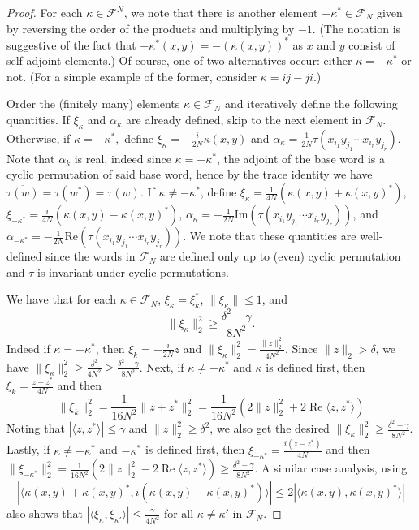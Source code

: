 \documentclass[10pt]{amsart}
\numberwithin{equation}{section}
\theoremstyle{definition}
\newcommand{\cF}{\mathcal{F}}
\begin{document}
\begin{proof}
    For each $\kappa\in \cF^{N}$, we note that there is another element $-\kappa^* \in \cF_N$ given by reversing the order of the products and multiplying by $-1$. (The notation is suggestive of the fact that $-\kappa^*(x,y) = -(\kappa(x,y))^*$ as $x$ and $y$ consist of self-adjoint elements.) Of course, one of two alternatives occur: either $\kappa=-\kappa^*$ or not. (For a simple example of the former, consider $\kappa = ij-ji$.) 

    Order the (finitely many) elements $\kappa \in \cF_N$ and iteratively define the following quantities. 
    If $\xi_\kappa$ and $\alpha_\kappa$ are already defined, skip to the next element in $\cF_N$. 
    Otherwise, if $\kappa=-\kappa^*,$ define $\xi_\kappa = -\frac{i}{2N}\kappa(x,y)$ and $\alpha_\kappa = \frac{1}{2N} \tau(x_{i_1}y_{j_1}\cdots x_{i_r}y_{j_r})$. Note that $\alpha_k$ is real, indeed since $\kappa = -\kappa^\ast$, the adjoint of the base word is a cyclic permutation of said base word, hence by the trace identity we have $\overline{\tau(w)}=\tau(w^\ast) = \tau(w)$.
    If $\kappa\neq -\kappa^*$, define $\xi_\kappa = \frac{1}{4N}(\kappa(x,y)+\kappa(x,y)^*)$,
    $\xi_{-\kappa^*} = \frac{i}{4N}(\kappa(x,y)-\kappa(x,y)^*)$, 
    $\alpha_\kappa = -\frac{1}{2N}\mathrm{Im}(\tau(x_{i_1}y_{j_1}\cdots x_{i_r}y_{j_r}))$,
    and $\alpha_{-\kappa^*} = -\frac{1}{2N}\mathrm{Re}(\tau(x_{i_1}y_{j_1}\cdots x_{i_r}y_{j_r}))$. We note that these quantities are well-defined since the words in $\cF_N$ are defined only up to (even) cyclic permutation and $\tau$ is invariant under cyclic permutations.


    We have that for each $\kappa\in \cF_N$, $\xi_\kappa = \xi_\kappa^*$, $\|\xi_\kappa\| \le 1$, and $$\|\xi_\kappa\|_2^2 \geq \frac{\delta^2-\gamma}{8N^2}.$$ 
    Indeed if $\kappa = - \kappa^\ast$, then $\xi_k = - \frac i {2N}z$ and $\|\xi_\kappa\|_2^2 = \frac{\|z\|_2^2}{4N^2}$. Since $\|z\|_2 > \delta$, we have $\|\xi_\kappa\|_2^2 \ge \frac{\delta^2}{4N^2} \ge \frac{\delta^2 - \gamma}{8N^2}$. Next, if $\kappa \ne -\kappa^\ast$ and $\kappa$ is defined first, then $\xi_k = \frac{z+z^\ast}{4N}$ and then 
    $$\|\xi_k\|_2^2 = \frac 1 {16N^2}\|z+z^\ast\|_2^2 = \frac 1 {16N^2}(2\|z\|_2^2 + 2 \operatorname{Re} \langle z,z^\ast \rangle)$$
    Noting that $|\langle z,z^\ast \rangle| \le \gamma$ and $\|z\|_2^2 \ge \delta^2$, we also get the desired $\|\xi_\kappa\|_2^2 \ge \frac{\delta^2 - \gamma}{8N^2}$. Lastly, if $\kappa \ne -\kappa^\ast$ and $-\kappa^\ast$ is defined first, then $\xi_{-\kappa^\ast} = \frac{i(z-z^\ast)}{4N}$ and then $\|\xi_{-\kappa^\ast}\|_2^2 = \frac 1 {16N^2}(2\|z\|_2^2 - 2 \operatorname{Re} \langle z,z^\ast \rangle) \ge \frac{\delta^2 - \gamma}{8N^2}$. A similar case analysis, using 
    $$|\langle \kappa(x,y)+\kappa(x,y)^*,i(\kappa(x,y)-\kappa(x,y)^*)\rangle| \le 2|\langle \kappa(x,y),\kappa(x,y)^*\rangle|$$
    also shows that $|\langle \xi_\kappa, \xi_{\kappa'}\rangle| \le \frac{\gamma}{4N^2}$ for all $\kappa \ne \kappa'$ in $\cF_N$.
    

\end{proof}
\end{document}
